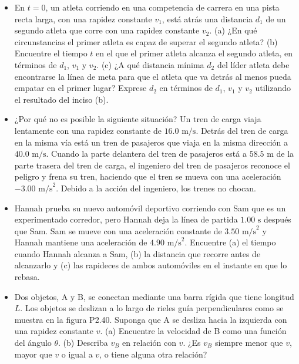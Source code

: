 \documentclass[11pt,a4paper]{article}
\begin{document}
\newpage

\begin{itemize}
    \item[\textbf{37.}] En $t = 0$, un atleta corriendo en una competencia de carrera en una pista recta larga, con una rapidez constante $v_1$, está atrás una distancia $d_1$ de un segundo atleta que corre con una rapidez constante $v_2$. (a) ¿En qué circunstancias el primer atleta es capaz de superar el segundo atleta? (b) Encuentre el tiempo $t$ en el que el primer atleta alcanza el segundo atleta, en términos de $d_1$, $v_1$ y $v_2$. (c) ¿A qué distancia mínima $d_2$ del líder atleta debe encontrarse la línea de meta para que el atleta que va detrás al menos pueda empatar en el primer lugar? Exprese $d_2$ en términos de $d_1$, $v_1$ y $v_2$ utilizando el resultado del inciso (b).
    \vspace*{6cm}

    \item[\textbf{38.}] ¿Por qué no es posible la siguiente situación? Un tren de carga viaja lentamente con una rapidez constante de $16.0 \text{ m/s}$. Detrás del tren de carga en la misma vía está un tren de pasajeros que viaja en la misma dirección a $40.0 \text{ m/s}$. Cuando la parte delantera del tren de pasajeros está a $58.5 \text{ m}$ de la parte trasera del tren de carga, el ingeniero del tren de pasajeros reconoce el peligro y frena su tren, haciendo que el tren se mueva con una aceleración $-3.00 \text{ m/s}^2$. Debido a la acción del ingeniero, los trenes no chocan.
    \vspace*{6cm}

    \item[\textbf{39.}] Hannah prueba su nuevo automóvil deportivo corriendo con Sam que es un experimentado corredor, pero Hannah deja la línea de partida $1.00 \text{ s}$ después que Sam. Sam se mueve con una aceleración constante de $3.50 \text{ m/s}^2$ y Hannah mantiene una aceleración de $4.90 \text{ m/s}^2$. Encuentre (a) el tiempo cuando Hannah alcanza a Sam, (b) la distancia que recorre antes de alcanzarlo y (c) las rapideces de ambos automóviles en el instante en que lo rebasa.
    \vspace*{6cm}

    \item[\textbf{40.}] Dos objetos, A y B, se conectan mediante una barra rígida que tiene longitud $L$. Los objetos se deslizan a lo largo de rieles guía perpendiculares como se muestra en la figura P2.40. Suponga que A se desliza hacia la izquierda con una rapidez constante $v$. (a) Encuentre la velocidad de B como una función del ángulo $\theta$. (b) Describa $v_B$ en relación con $v$. ¿Es $v_B$ siempre menor que $v$, mayor que $v$ o igual a $v$, o tiene alguna otra relación?
    \vspace*{6cm}


\end{itemize}
\end{document}
